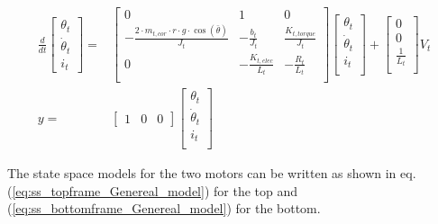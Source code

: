 \documentclass[../../main]{subfiles}
\begin{document}
\begin{equation}
      \label{eq:topframe_mech_linearized}
      \begin{split}
      \frac{d}{dt}
    \begin{bmatrix}
        \theta_t \\
        \dot \theta_t \\
        i_t
    \end{bmatrix}
    =&
    \begin{bmatrix}
        0 & 1               & 0             \\
        -\frac{2\cdot m_{t,cor}\cdot r \cdot g \cdot \cos(\bar \theta)}{J_t} & -\frac{b_t}{J_t}    & \frac{K_{t,torque}}{J_t} \\
        0 & -\frac{K_{t,elec}}{L_t}  & -\frac{R_t}{L_t}  \\
    \end{bmatrix}
    \begin{bmatrix}
        \theta_t \\
        \dot \theta_t \\
        i_t \\
    \end{bmatrix}
    +
    \begin{bmatrix}
        0 \\
        0 \\
        \frac{1}{L_t} \\
    \end{bmatrix}
    V_t
\\
      y =&
    \begin{bmatrix}
        1 & 0 & 0
    \end{bmatrix}
    \begin{bmatrix}
        \theta_t \\
        \dot \theta_t\\
        i_t\\
    \end{bmatrix}
    \end{split}
\end{equation}

The state space models for the two motors can be written as shown in eq. (\ref{eq:ss_topframe_Genereal_model}) for the top and (\ref{eq:ss_bottomframe_Genereal_model}) for the bottom.
\end{document}

